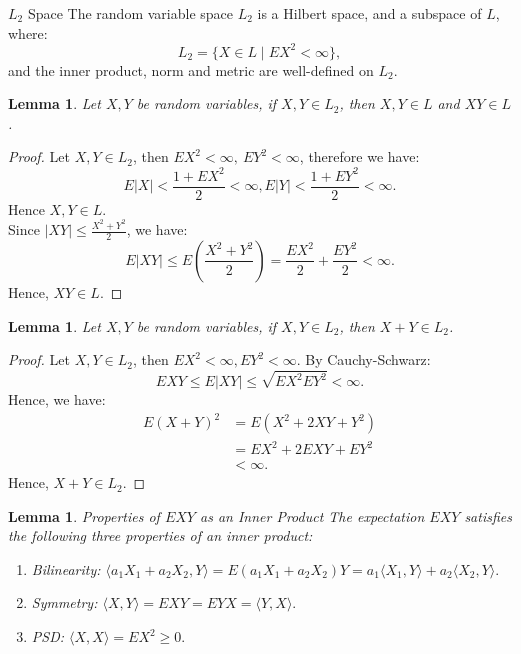 \documentclass[11pt]{article}
\makeatletter
\newenvironment{definition}[1]{\begin{defbox}{#1}{}}{\end{defbox}}
\theoremstyle{quiet}
\newtheorem{lemma}[tcb@cnt@defbox]{Lemma}
\theoremstyle{quietremark}
\newcommand{\1}{\mathbf{1}}            %
\makeatother
\begin{document}
\begin{definition}{$L_2$ Space}
The random variable space $L_2$ is a Hilbert space, and a subspace of $L$, where:
\[
L_2=\{X\in L\mid EX^2<\infty\},
\]
and the inner product, norm and metric are well-defined on $L_2$.
\end{definition}

\begin{lemma}
Let $X,Y$ be random variables, if $X,Y\in L_2$, then $X,Y\in L$ and $XY\in L$.
\end{lemma}

\begin{proof}
Let $X,Y\in L_2$, then $EX^2<\infty,~EY^2<\infty$, therefore we have:
\[
\displaystyle E|X|<\frac{1+EX^2}{2}<\infty, E|Y|<\frac{1+EY^2}{2}<\infty.
\] 
Hence $X,Y\in L$.\\
Since $\displaystyle|XY|\le \frac{X^2+Y^2}{2}$, we have:
\[
\displaystyle E|XY|\le E\left(\frac{X^2+Y^2}{2}\right)=\frac{EX^2}{2}+\frac{EY^2}{2}<\infty.
\]
Hence, $XY\in L$.
\end{proof}

\begin{lemma}
Let $X,Y$ be random variables, if $X,Y\in L_2$, then $X+Y\in L_2$.
\end{lemma}

\begin{proof}
Let $X,Y\in L_2$, then $EX^2<\infty, EY^2<\infty$. By Cauchy-Schwarz:
\[
EXY\le E|XY|\le\sqrt{EX^2EY^2}<\infty.
\]
Hence, we have:
\[
\begin{aligned}
E(X+Y)^2&=E(X^2+2XY+Y^2)\\&=EX^2+2EXY+EY^2\\&<\infty.
\end{aligned}
\]
Hence, $X+Y\in L_2$.
\end{proof}

\begin{lemma}{Properties of $EXY$ as an Inner Product}
The expectation $EXY$ satisfies the following three properties of an inner product:
\begin{enumerate}
\item Bilinearity: $\langle a_1X_1+a_2X_2,Y\rangle=E(a_1X_1+a_2X_2)Y=a_1\langle X_1,Y\rangle+a_2\langle X_2,Y\rangle.$
\item Symmetry: $\langle X,Y\rangle=EXY=EYX=\langle Y,X\rangle.$
\item PSD: $\langle X,X\rangle=EX^2\ge 0.$
\end{enumerate}
\end{lemma}
\end{document}
